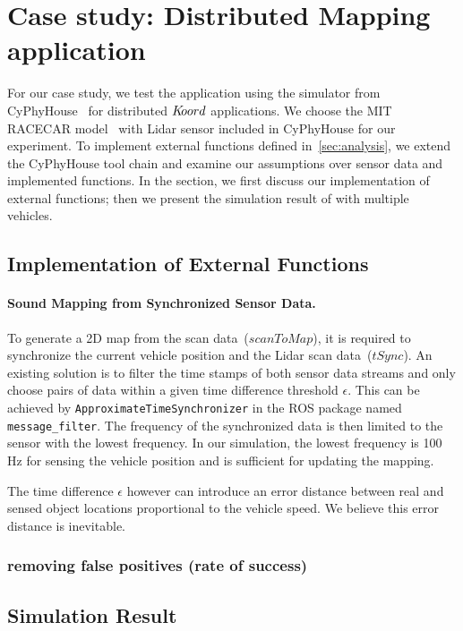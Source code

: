 \newcommand{\Koord}{\ensuremath{\lgname}\xspace}
\newcommand{\CyPhyHouse}{CyPhyHouse\xspace}
\newcommand{\Gazebo}{Gazebo\xspace}

\newcommand{\ScanToMap}{\ensuremath{\mathit{scanToMap}}\xspace}
\newcommand{\TSync}{\ensuremath{\mathit{tSync}}\xspace}

\section{Case study: Distributed Mapping application}
\label{sec:experims}

For our case study, we test the \dmap application using the simulator from \CyPhyHouse~\cite{ghosh2019cyphyhouse} for distributed \Koord applications.
We choose the MIT RACECAR model~\cite{MIT_RACECAR} with Lidar sensor included in \CyPhyHouse for our experiment.
To implement external functions defined in~\ref{sec:analysis},
we extend the \CyPhyHouse tool chain and examine our assumptions over sensor data and implemented functions.
In the section, we first discuss our implementation of external functions;
then we present the simulation result of \dmap with multiple vehicles.


\subsection{Implementation of External Functions}

\paragraph{Sound Mapping from Synchronized Sensor Data.}
To generate a 2D map from the scan data~(\ScanToMap),
it is required to synchronize the current vehicle position and the Lidar scan data~(\TSync).
An existing solution is to filter the time stamps of both sensor data streams
and only choose pairs of data within a given time difference threshold $\epsilon$.
This can be achieved by \texttt{ApproximateTimeSynchronizer} in the ROS package named \texttt{message\_filter}.
The frequency of the synchronized data is then limited to the sensor with the lowest frequency.
In our simulation, the lowest frequency is 100 Hz for sensing the vehicle position and is sufficient for updating the mapping.

The time difference $\epsilon$ however can introduce an error distance between real and sensed object locations proportional to the vehicle speed.
We believe this error distance is inevitable.

\subsubsection{removing false positives (rate of success)}


\subsection{Simulation Result}


